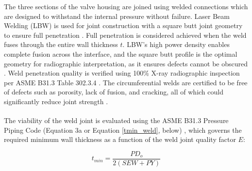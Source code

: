\documentclass[12pt, letterpaper]{report}%
\begin{document}
            The three sections of the valve housing are joined using welded connections which are designed to withstand the internal pressure without failure.
            Laser Beam Welding (LBW) is used for joint construction with a square butt joint geometry to ensure 
            full penetration \cite{steen2010laser}.
            Full penetration is considered achieved when the weld fuses through the entire wall thickness $t$.
            LBW's high power density enables complete fusion across the interface, and the square butt profile 
            is the optimal geometry for radiographic interpretation, as it ensures defects cannot be obscured 
            \cite{aws2020welding}.
            Weld penetration quality is verified using 100\% X-ray radiographic inspection per ASME B31.3 
            Table 302.3.4 \cite{asme_b313}.
            The circumferential welds are certified to be free of defects such as porosity, lack of fusion, 
            and cracking, all of which could significantly reduce joint strength \cite{aws2020welding}.
            \\~\\
            The viability of the weld joint is evaluated using the ASME B31.3 Pressure Piping Code 
            (Equation 3a or Equation \eqref{tmin_weld}, below) \cite{asme_b313}, which governs the required minimum wall thickness as a function 
            of the weld joint quality factor $E$:
            
            \begin{equation}
            t_{min} = \frac{P D_o}{2(SEW + PY)}
            \label{tmin_weld}
            \end{equation}
\end{document}
